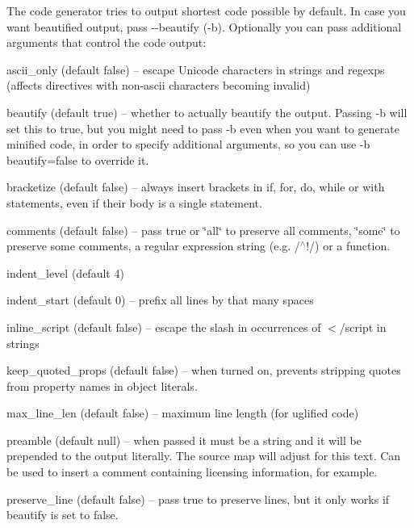 The code generator tries to output shortest code possible by default. In case you want beautified output, pass {\ttfamily -\/-\/beautify} ({\ttfamily -\/b}). Optionally you can pass additional arguments that control the code output\+:


\begin{DoxyItemize}
\item {\ttfamily ascii\+\_\+only} (default {\ttfamily false}) -- escape Unicode characters in strings and regexps (affects directives with non-\/ascii characters becoming invalid)
\item {\ttfamily beautify} (default {\ttfamily true}) -- whether to actually beautify the output. Passing {\ttfamily -\/b} will set this to true, but you might need to pass {\ttfamily -\/b} even when you want to generate minified code, in order to specify additional arguments, so you can use {\ttfamily -\/b beautify=false} to override it.
\item {\ttfamily bracketize} (default {\ttfamily false}) -- always insert brackets in {\ttfamily if}, {\ttfamily for}, {\ttfamily do}, {\ttfamily while} or {\ttfamily with} statements, even if their body is a single statement.
\item {\ttfamily comments} (default {\ttfamily false}) -- pass {\ttfamily true} or {\ttfamily \char`\"{}all\char`\"{}} to preserve all comments, {\ttfamily \char`\"{}some\char`\"{}} to preserve some comments, a regular expression string (e.\+g. {\ttfamily /$^\wedge$!/}) or a function.
\item {\ttfamily indent\+\_\+level} (default 4)
\item {\ttfamily indent\+\_\+start} (default 0) -- prefix all lines by that many spaces
\item {\ttfamily inline\+\_\+script} (default {\ttfamily false}) -- escape the slash in occurrences of {\ttfamily $<$/script} in strings
\item {\ttfamily keep\+\_\+quoted\+\_\+props} (default {\ttfamily false}) -- when turned on, prevents stripping quotes from property names in object literals.
\item {\ttfamily max\+\_\+line\+\_\+len} (default {\ttfamily false}) -- maximum line length (for uglified code)
\item {\ttfamily preamble} (default {\ttfamily null}) -- when passed it must be a string and it will be prepended to the output literally. The source map will adjust for this text. Can be used to insert a comment containing licensing information, for example.
\item {\ttfamily preserve\+\_\+line} (default {\ttfamily false}) -- pass {\ttfamily true} to preserve lines, but it only works if {\ttfamily beautify} is set to {\ttfamily false}.

\end{DoxyItemize}
